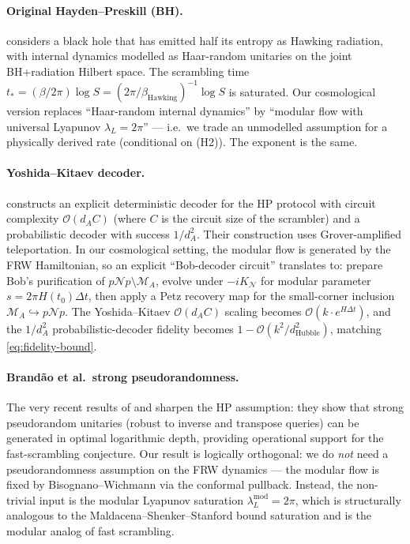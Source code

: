 \documentclass[11pt]{article}
\theoremstyle{definition}
\theoremstyle{remark}
\newcommand{\N}{\mathcal{N}}
\newcommand{\M}{\mathcal{M}}
\newcommand{\OO}{\mathcal{O}}
\begin{document}
\paragraph{Original Hayden--Preskill (BH).} \cite{HaydenPreskill07}
considers a black hole that has emitted half its entropy as Hawking
radiation, with internal dynamics modelled as Haar-random unitaries on
the joint BH+radiation Hilbert space. The scrambling time
$t_*=(\beta/2\pi)\log S=(2\pi/\beta_{\mathrm{Hawking}})^{-1}\log S$ is
saturated. Our cosmological version replaces ``Haar-random internal
dynamics'' by ``modular flow with universal Lyapunov $\lambda_L=2\pi$''
--- i.e.\ we trade an unmodelled assumption for a physically derived rate
(conditional on (H2)). The exponent is the same.

\paragraph{Yoshida--Kitaev decoder.} \cite{YoshidaKitaev17} constructs an
explicit deterministic decoder for the HP protocol with circuit
complexity $\OO(d_A C)$ (where $C$ is the circuit size of the scrambler)
and a probabilistic decoder with success $1/d_A^2$. Their construction
uses Grover-amplified teleportation. In our cosmological setting, the
modular flow is generated by the FRW Hamiltonian, so an explicit
``Bob-decoder circuit'' translates to: prepare Bob's purification of
$p\N p\setminus\M_A$, evolve under $-iK_\N$ for modular parameter
$s=2\pi H(t_0)\Delta t$, then apply a Petz recovery map for the
small-corner inclusion $\M_A\hookrightarrow p\N p$. The Yoshida--Kitaev
$\OO(d_A C)$ scaling becomes $\OO(k\cdot e^{H\Delta t})$, and the
$1/d_A^2$ probabilistic-decoder fidelity becomes $1-\OO(k^2/d_{\mathrm{Hubble}}^2)$,
matching \eqref{eq:fidelity-bound}.

\paragraph{Brand\~ao et al.\ strong pseudorandomness.} The very recent
results of \cite{ChenBouland24} and \cite{Schuster25} sharpen the HP
assumption: they show that strong pseudorandom unitaries (robust to
inverse and transpose queries) can be generated in optimal logarithmic
depth, providing operational support for the fast-scrambling conjecture.
Our result is logically orthogonal: we do \emph{not} need a
pseudorandomness assumption on the FRW dynamics --- the modular flow is
fixed by Bisognano--Wichmann via the conformal pullback. Instead, the
non-trivial input is the modular Lyapunov saturation
$\lambda_L^{\mathrm{mod}}=2\pi$, which is structurally analogous to the
Maldacena--Shenker--Stanford bound saturation \cite{MSS15} and is the
modular analog of fast scrambling.
\end{document}
